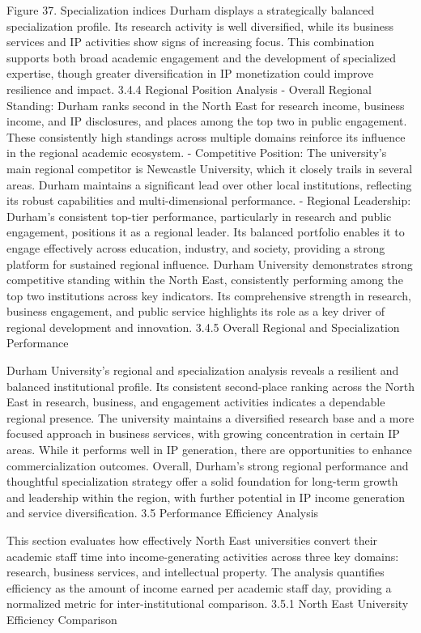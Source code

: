 Figure 37. Specialization indices
Durham displays a strategically balanced specialization profile. Its research activity is well diversified, while its business services and IP activities show signs of increasing focus. This combination supports both broad academic engagement and the development of specialized expertise, though greater diversification in IP monetization could improve resilience and impact.
3.4.4 Regional Position Analysis
- Overall Regional Standing: Durham ranks second in the North East for research income, business income, and IP disclosures, and places among the top two in public engagement. These consistently high standings across multiple domains reinforce its influence in the regional academic ecosystem.
- Competitive Position: The university's main regional competitor is Newcastle University, which it closely trails in several areas. Durham maintains a significant lead over other local institutions, reflecting its robust capabilities and multi-dimensional performance.
- Regional Leadership: Durham's consistent top-tier performance, particularly in research and public engagement, positions it as a regional leader. Its balanced portfolio enables it to engage effectively across education, industry, and society, providing a strong platform for sustained regional influence.
Durham University demonstrates strong competitive standing within the North East, consistently performing among the top two institutions across key indicators. Its comprehensive strength in research, business engagement, and public service highlights its role as a key driver of regional development and innovation.
3.4.5 Overall Regional and Specialization Performance

Durham University's regional and specialization analysis reveals a resilient and balanced institutional profile. Its consistent second-place ranking across the North East in research, business, and engagement activities indicates a dependable regional presence. The university maintains a diversified research base and a more focused approach in business services, with growing concentration in certain IP areas. While it performs well in IP generation, there are opportunities to enhance commercialization outcomes. Overall, Durham's strong regional performance and thoughtful specialization strategy offer a solid foundation for long-term growth and leadership within the region, with further potential in IP income generation and service diversification.
3.5 Performance Efficiency Analysis

This section evaluates how effectively North East universities convert their academic staff time into income-generating activities across three key domains: research, business services, and intellectual property. The analysis quantifies efficiency as the amount of income earned per academic staff day, providing a normalized metric for inter-institutional comparison.
3.5.1 North East University Efficiency Comparison

